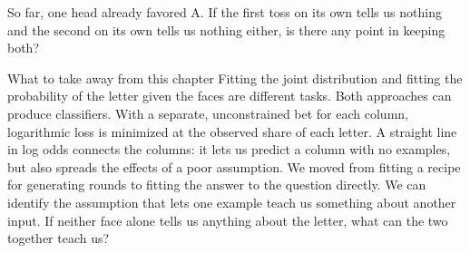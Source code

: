 So far, one head already favored A. If the first toss on its own tells us nothing and the second on its own tells us nothing either, is there any point in keeping both?

\begin{quadro}{What to take away from this chapter}
 Fitting the joint distribution and fitting the probability of the letter given the faces are different tasks. Both approaches can produce classifiers.
 With a separate, unconstrained bet for each column, logarithmic loss is minimized at the observed share of each letter.
 A straight line in log odds connects the columns: it lets us predict a column with no examples, but also spreads the effects of a poor assumption.
 We moved from fitting a recipe for generating rounds to fitting the answer to the question directly. We can identify the assumption that lets one example teach us something about another input.
 If neither face alone tells us anything about the letter, what can the two together teach us?
\end{quadro}
